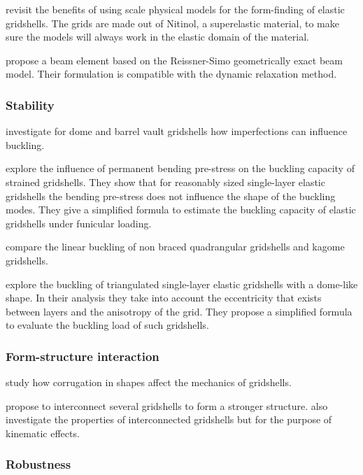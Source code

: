  revisit the benefits of using scale physical models for the form-finding of elastic gridshells. The grids are made out of Nitinol, a superelastic material, to make sure the models will always work in the elastic domain of the material.

 propose a beam element based on the Reissner-Simo geometrically exact beam model. Their formulation is compatible with the dynamic relaxation method.

\subsubsection{Stability}

 investigate for dome and barrel vault gridshells how imperfections can influence buckling.

 explore the influence of permanent bending pre-stress on the buckling capacity of strained gridshells. They show that for reasonably sized single-layer elastic gridshells the bending pre-stress does not influence the shape of the buckling modes. They give a simplified formula to estimate the buckling capacity of elastic gridshells under funicular loading.

 compare the linear buckling of non braced quadrangular gridshells and kagome gridshells.

\citet{Lefevre2015} explore the buckling of triangulated single-layer elastic gridshells with a dome-like shape. In their analysis they take into account the eccentricity that exists between layers and the anisotropy of the grid. They propose a simplified formula to evaluate the buckling load of such gridshells.

\subsubsection{Form-structure interaction}

 study how corrugation in shapes affect the mechanics of gridshells.

 propose to interconnect several gridshells to form a stronger structure.  also investigate the properties of interconnected gridshells but for the purpose of kinematic effects.

\subsubsection{Robustness}


